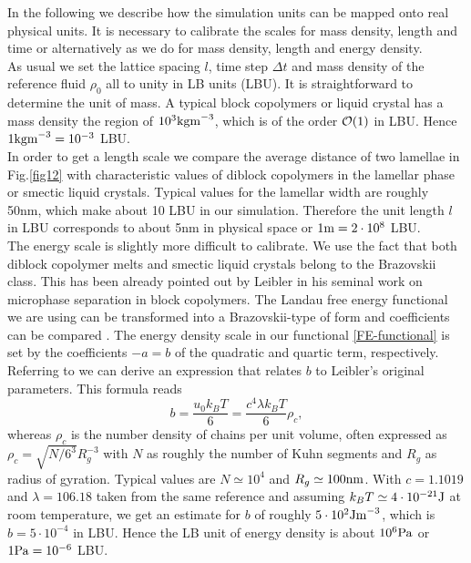 \documentclass[8.5pt,twoside,twocolumn]{article}
\newcommand{\e}[1]{\cdot10^{#1}}
\begin{document}
In the following we describe how the simulation units can be mapped onto real physical units.
It is necessary to calibrate the scales for mass density, length and time or alternatively as we do for mass density, length and energy density.\\
As usual we set the lattice spacing $l$, time step $\Delta t$ and mass density of the reference fluid $\rho_0$ all to unity in LB units (LBU).
It is straightforward to determine the unit of mass. 
A typical block copolymers or liquid crystal has a mass density the region of $10^3 {\rm kg m}^{-3}$, which is of the order ${\cal O}(1)$ in LBU.
Hence $1 {\rm kg m}^{-3}=10^{-3}$ LBU.\\
In order to get a length scale we compare the average distance of two lamellae in Fig.\ref{fig12} with characteristic values of diblock copolymers in the lamellar phase or smectic liquid crystals.
Typical values for the lamellar width are roughly 50nm, which make about 10 LBU in our simulation.
Therefore the unit length $l$ in LBU corresponds to about 5nm in physical space or $1 {\rm m}=2\cdot10^8$ LBU.\\
The energy scale is slightly more difficult to calibrate.
We use the fact that both diblock copolymer melts and smectic liquid crystals belong to the Brazovskii class.
This has been already pointed out by Leibler \cite{Leibler80} in his seminal work on microphase separation in block copolymers.
The Landau free energy functional we are using can be transformed into a Brazovskii-type of form and coefficients can be compared \cite{Xu05, Fredrickson89}.
The energy density scale in our functional \ref{FE-functional} is set by the coefficients $-a=b$ of the quadratic and quartic term, respectively.
Referring to \cite{Fredrickson89} we can derive an expression that relates $b$ to Leibler's original parameters.
This formula reads 
\begin{equation}
b=\frac{u_0 k_B T}{6}=\frac{c^4\lambda k_B T}{6} \rho_c,
\end{equation}
whereas $\rho_c$ is the number density of chains per unit volume,
often expressed as $\rho_c=\sqrt{N/6^3} R_g^{-3}$ with $N$ as roughly the number of Kuhn segments and $R_g$ as radius of gyration.
Typical values are $N\simeq10^4$ and $R_g\simeq 100{\rm nm}$.
With $c=1.1019$ and $\lambda=106.18$ taken from the same reference and assuming $k_B T\simeq 4\e{-21} {\rm J}$ at room temperature, we get an estimate for $b$ of roughly $5\e{2} {\rm J m}^{-3}$, which is $b=5\e{-4}$ in LBU.
Hence the LB unit of energy density is about $10^{6} \rm{Pa}$ or $1\rm{Pa}=10^{-6}$ LBU.\\
\end{document}
